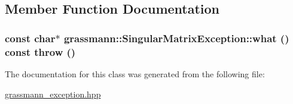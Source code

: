 \subsection{Member Function Documentation}
\hypertarget{classgrassmann_1_1SingularMatrixException_c23401f8fafc59228076764730cdac52}{
\subsubsection[what]{\setlength{\rightskip}{0pt plus 5cm}const char$\ast$ grassmann::SingularMatrixException::what () const  throw ()}}
\label{classgrassmann_1_1SingularMatrixException_c23401f8fafc59228076764730cdac52}




The documentation for this class was generated from the following file:\begin{CompactItemize}
\item 
\hyperlink{grassmann__exception_8hpp}{grassmann\_\-exception.hpp}\end{CompactItemize}
